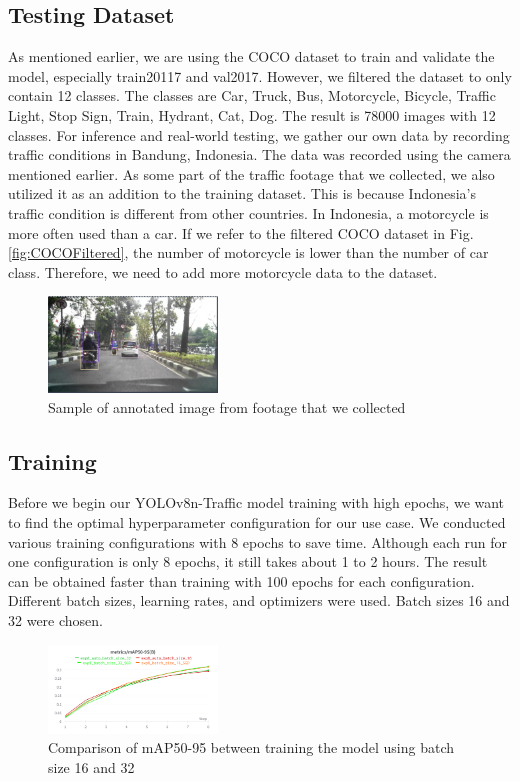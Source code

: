\documentclass[conference]{IEEEtran}
\begin{document}
\subsection{Testing Dataset}
As mentioned earlier, we are using the COCO dataset to train and validate the model, especially train20117 and val2017. However, we filtered the dataset to only contain 12 classes. The classes are
Car, Truck, Bus, Motorcycle, Bicycle, Traffic Light, Stop Sign, Train, Hydrant, Cat, Dog. The result is 78000 images with 12 classes.
For inference and real-world testing, we gather our own data by recording traffic conditions in Bandung, Indonesia. The data was recorded using the camera mentioned earlier.
As some part of the traffic footage that we collected, we also utilized it as an addition to the training dataset. This is because Indonesia's traffic condition is different from other countries. In Indonesia, a motorcycle is more often used than a car.
If we refer to the filtered COCO dataset in Fig.\ref{fig:COCOFiltered}, the number of motorcycle is lower than the number of car class. Therefore, we need to add more motorcycle data to the dataset.
\begin{figure}[h]
\centering
\includegraphics[width=0.4\textwidth,keepaspectratio]{sample_dataset.png}
\caption{Sample of annotated image from footage that we collected}
\end{figure}

\subsection{Training}
Before we begin our YOLOv8n-Traffic model training with high epochs, we want to find the optimal hyperparameter configuration for our use case. We conducted various training configurations with 8 epochs to save time. Although each run for one configuration is only 8 epochs, it still takes about 1 to 2 hours. The result can be obtained faster than training with 100 epochs for each configuration.
Different batch sizes, learning rates, and optimizers were used. Batch sizes 16 and 32 were chosen.
\begin{figure}[h]
\centering
\includegraphics[width=0.4\textwidth,keepaspectratio]{mAP_batch_size_comparison.png} %
\caption{Comparison of mAP50-95 between training the model using batch size 16 and 32}
\label{fig:batch_size}
\end{figure}
\end{document}
